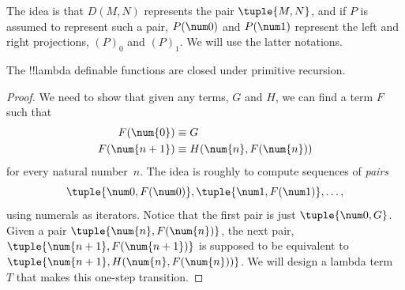 \documentclass[../../../include/open-logic-section]{subfiles}
\begin{document}
The idea is that $D(M,N)$ represents the pair $\tuple{M, N}$, and if
$P$ is assumed to represent such a pair, $P(\num 0)$ and $P(\num 1)$
represent the left and right projections, $(P)_0$ and $(P)_1$. We will
use the latter notations.

\begin{lem}
The !!{lambda definable} functions are closed under primitive recursion.
\end{lem}

\begin{proof}
We need to show that given any terms, $G$ and $H$, we can find a term
$F$ such that
\begin{align*}
F(\num{0}) & \equiv G \\
F(\num{n+1}) & \equiv H(\num{n}, F(\num{n}))
\end{align*}
for every natural number~$n$. The idea is roughly to compute sequences
of \emph{pairs}
\[
\tuple{\num 0, F(\num 0)}, \tuple{\num 1, F(\num 1)}, \dots,
\]
using numerals as iterators. Notice that the first pair is just
$\tuple{\num 0, G}$. Given a pair $\tuple{\num{n}, F(\num{n})}$, the
next pair, $\tuple{\num{n+1}, F(\num{n+1})}$ is supposed to
be equivalent to $\tuple{\num{n+1}, H(\num{n}, F(\num{n}))}$. We
will design a lambda term~$T$ that makes this one-step transition.


\end{proof}
\end{document}
